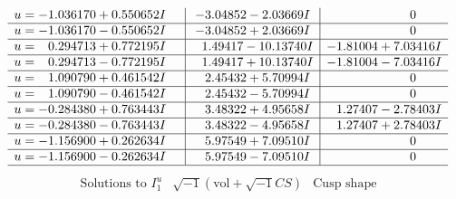 \documentclass[1p]{elsarticle_modified}
\theoremstyle{definition}
\newcommand{\I}{\sqrt{-1}}
\begin{document}
$$\begin{array}{c|c|c}
\begin{aligned}
u &= -1.036170 + 0.550652 I\end{aligned}
 & -3.04852 - 2.03669 I & \phantom{-0.000000 } 0 \\ \hline\begin{aligned}
u &= -1.036170 - 0.550652 I\end{aligned}
 & -3.04852 + 2.03669 I & \phantom{-0.000000 } 0 \\ \hline\begin{aligned}
u &= \phantom{-}0.294713 + 0.772195 I\end{aligned}
 & \phantom{-}1.49417 - 10.13740 I & -1.81004 + 7.03416 I \\ \hline\begin{aligned}
u &= \phantom{-}0.294713 - 0.772195 I\end{aligned}
 & \phantom{-}1.49417 + 10.13740 I & -1.81004 - 7.03416 I \\ \hline\begin{aligned}
u &= \phantom{-}1.090790 + 0.461542 I\end{aligned}
 & \phantom{-}2.45432 + 5.70994 I & \phantom{-0.000000 } 0 \\ \hline\begin{aligned}
u &= \phantom{-}1.090790 - 0.461542 I\end{aligned}
 & \phantom{-}2.45432 - 5.70994 I & \phantom{-0.000000 } 0 \\ \hline\begin{aligned}
u &= -0.284380 + 0.763443 I\end{aligned}
 & \phantom{-}3.48322 + 4.95658 I & \phantom{-}1.27407 - 2.78403 I \\ \hline\begin{aligned}
u &= -0.284380 - 0.763443 I\end{aligned}
 & \phantom{-}3.48322 - 4.95658 I & \phantom{-}1.27407 + 2.78403 I \\ \hline\begin{aligned}
u &= -1.156900 + 0.262634 I\end{aligned}
 & \phantom{-}5.97549 + 7.09510 I & \phantom{-0.000000 } 0 \\ \hline\begin{aligned}
u &= -1.156900 - 0.262634 I\end{aligned}
 & \phantom{-}5.97549 - 7.09510 I & \phantom{-0.000000 } 0\\
 \hline 
 \end{array}$$\newpage$$\begin{array}{c|c|c}  
\text{Solutions to }I^u_{1}& \I (\text{vol} + \sqrt{-1}CS) & \text{Cusp shape}\\

\end{array}$$
\end{document}
